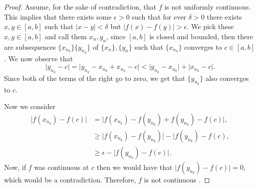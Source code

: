 \documentclass[twoside]{article}
\begin{document}
    \begin{proof}
        Assume, for the sake of contradiction, that $f$ is not uniformly continuous. This implies that there exists
        some $\epsilon > 0$ such that for ever $\delta > 0$ there exists $x, y \in [a, b]$ such that 
        $\lvert x - y \rvert < \delta$ but $\lvert f(x) - f(y) \rvert > \epsilon$. We pick these $x, y \in [a, b]$ and 
    call them $x_{n}, y_{n}$, since $[a, b]$ is closed and bounded, then there are subsequences $\{x_{n_{k}}\} \{y_{n_{k}}\}$
        of $\{x_{n}\}, \{y_{n}\}$ such that $\{x_{n_{k}}\}$ converges to $c \in [a,b]$. We now observe that 
        \begin{equation*}
            \lvert y_{n_{k}} - c \rvert = \lvert y_{n_{k}} - x_{n_{k}} + x_{n_{k}} - c \rvert 
            < \rvert y_{n_{k}} - x_{n_{k}} \rvert + \lvert x_{n_{k}} - c \rvert.
        \end{equation*}
        Since both of the terms of the right go to zero, we get that $\{y_{n_{k}}\}$ also converges to $c$.

        Now we consider
        \begin{align*}
            \lvert f(x_{n_{k}}) - f(c) \rvert &= \lvert f(x_{n_{k}}) - f(y_{n_{k}}) + f(y_{n_{k}}) - f(c) \rvert, \\
            &\geq \lvert f(x_{n_{k}}) - f(y_{n_{k}}) \rvert - \lvert f(y_{n_{k}}) - f(c), \\
            &\geq \epsilon - \lvert f(y_{n_{k}}) - f(c) \rvert.
        \end{align*}
        Now, if $f$ was continuous at $c$ then we would have that $\lvert f(y_{n_{k}}) - f(c) \rvert = 0$,
        which would be a contradiction.
        Therefore, $f$ is not continuous \contra.
    \end{proof}
\end{document}
